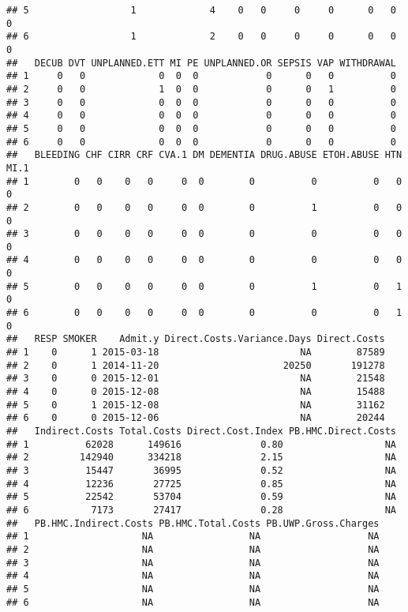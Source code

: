 \documentclass[]{article}
\begin{document}
\begin{verbatim}
## 5                  1             4    0   0     0     0      0   0   0
## 6                  1             2    0   0     0     0      0   0   0
##   DECUB DVT UNPLANNED.ETT MI PE UNPLANNED.OR SEPSIS VAP WITHDRAWAL
## 1     0   0             0  0  0            0      0   0          0
## 2     0   0             1  0  0            0      0   1          0
## 3     0   0             0  0  0            0      0   0          0
## 4     0   0             0  0  0            0      0   0          0
## 5     0   0             0  0  0            0      0   0          0
## 6     0   0             0  0  0            0      0   0          0
##   BLEEDING CHF CIRR CRF CVA.1 DM DEMENTIA DRUG.ABUSE ETOH.ABUSE HTN MI.1
## 1        0   0    0   0     0  0        0          0          0   0    0
## 2        0   0    0   0     0  0        0          1          0   0    0
## 3        0   0    0   0     0  0        0          0          0   0    0
## 4        0   0    0   0     0  0        0          0          0   0    0
## 5        0   0    0   0     0  0        0          1          0   1    0
## 6        0   0    0   0     0  0        0          0          0   1    0
##   RESP SMOKER    Admit.y Direct.Costs.Variance.Days Direct.Costs
## 1    0      1 2015-03-18                         NA        87589
## 2    0      1 2014-11-20                      20250       191278
## 3    0      0 2015-12-01                         NA        21548
## 4    0      0 2015-12-08                         NA        15488
## 5    0      1 2015-12-08                         NA        31162
## 6    0      0 2015-12-06                         NA        20244
##   Indirect.Costs Total.Costs Direct.Cost.Index PB.HMC.Direct.Costs
## 1          62028      149616              0.80                  NA
## 2         142940      334218              2.15                  NA
## 3          15447       36995              0.52                  NA
## 4          12236       27725              0.85                  NA
## 5          22542       53704              0.59                  NA
## 6           7173       27417              0.28                  NA
##   PB.HMC.Indirect.Costs PB.HMC.Total.Costs PB.UWP.Gross.Charges
## 1                    NA                 NA                   NA
## 2                    NA                 NA                   NA
## 3                    NA                 NA                   NA
## 4                    NA                 NA                   NA
## 5                    NA                 NA                   NA
## 6                    NA                 NA                   NA

\end{verbatim}
\end{document}
